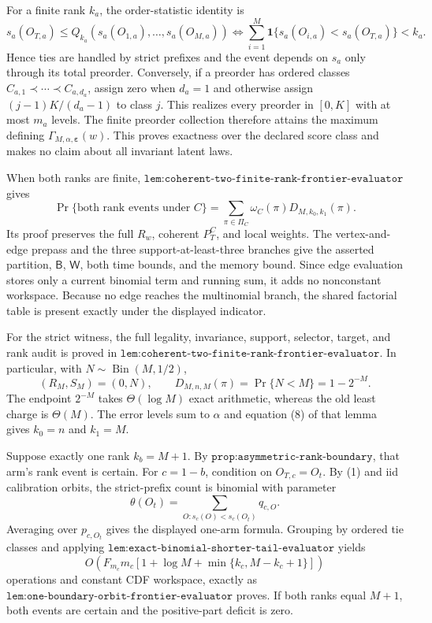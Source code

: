 For a finite rank \(k_a\), the order-statistic identity is
\[
s_a(O_{T,a})\le Q_{k_a}(s_a(O_{1,a}),\ldots,s_a(O_{M,a}))
\iff
\sum_{i=1}^M\mathbf 1\{s_a(O_{i,a})<s_a(O_{T,a})\}<k_a.
\tag{1}
\]
Hence ties are handled by strict prefixes and the event depends on \(s_a\) only through its total preorder. Conversely, if a preorder has ordered classes \(C_{a,1}\prec\cdots\prec C_{a,d_a}\), assign zero when \(d_a=1\) and otherwise assign \((j-1)K/(d_a-1)\) to class \(j\). This realizes every preorder in \([0,K]\) with at most \(m_a\) levels. The finite preorder collection therefore attains the maximum defining \(\Gamma_{M,\alpha,\boldsymbol\varepsilon}(w)\). This proves exactness over the declared score class and makes no claim about all invariant latent laws.

When both ranks are finite, \(\texttt{lem:coherent-two-finite-rank-frontier-evaluator}\) gives
\[
\Pr\{\text{both rank events under }C\}
=\sum_{\pi\in\Pi_C}\omega_C(\pi)D_{M,k_0,k_1}(\pi).
\tag{2}
\]
Its proof preserves the full \(R_w\), coherent \(P_T^C\), and local weights. The vertex-and-edge prepass and the three support-at-least-three branches give the asserted partition, \(\mathsf B\), \(\mathsf W\), both time bounds, and the memory bound. Since edge evaluation stores only a current binomial term and running sum, it adds no nonconstant workspace. Because no edge reaches the multinomial branch, the shared factorial table is present exactly under the displayed indicator.

For the strict witness, the full legality, invariance, support, selector, target, and rank audit is proved in \(\texttt{lem:coherent-two-finite-rank-frontier-evaluator}\). In particular, with \(N\sim\operatorname{Bin}(M,1/2)\),
\[
(R_M,S_M)=(0,N),\qquad
D_{M,n,M}(\pi)=\Pr\{N<M\}=1-2^{-M}.
\tag{3}
\]
The endpoint \(2^{-M}\) takes \(\Theta(\log M)\) exact arithmetic, whereas the old least charge is \(\Theta(M)\). The error levels sum to \(\alpha\) and equation (8) of that lemma gives \(k_0=n\) and \(k_1=M\).

Suppose exactly one rank \(k_b=M+1\). By \(\texttt{prop:asymmetric-rank-boundary}\), that arm's rank event is certain. For \(c=1-b\), condition on \(O_{T,c}=O_t\). By (1) and iid calibration orbits, the strict-prefix count is binomial with parameter
\[
\theta(O_t)=\sum_{O:s_c(O)<s_c(O_t)}q_{c,O}.
\]
Averaging over \(p_{c,O_t}\) gives the displayed one-arm formula. Grouping by ordered tie classes and applying \(\texttt{lem:exact-binomial-shorter-tail-evaluator}\) yields
\[
O\!\left(F_{m_c}m_c[1+\log M+\min\{k_c,M-k_c+1\}]\right)
\]
operations and constant CDF workspace, exactly as \(\texttt{lem:one-boundary-orbit-frontier-evaluator}\) proves. If both ranks equal \(M+1\), both events are certain and the positive-part deficit is zero.

